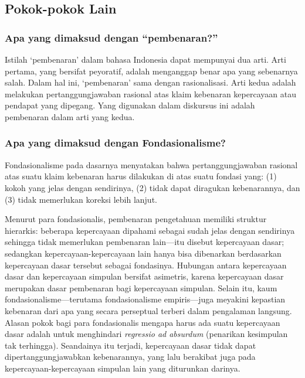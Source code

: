 \documentclass[11pt,twoside,a5paper,openany]{memoir}
\begin{document}
\hypertarget{pokok-pokok-lain-1}{%
\subsection{Pokok-pokok Lain}\label{pokok-pokok-lain-1}}

\hypertarget{apa-yang-dimaksud-dengan-pembenaran}{%
\subsubsection{Apa yang dimaksud dengan
``pembenaran?''}\label{apa-yang-dimaksud-dengan-pembenaran}}

Istilah `pembenaran' dalam bahasa Indonesia dapat mempunyai dua arti.
Arti pertama, yang bersifat peyoratif, adalah menganggap benar apa yang
sebenarnya salah. Dalam hal ini, `pembenaran' sama dengan rasionalisasi.
Arti kedua adalah melakukan pertanggungjawaban rasional atas klaim
kebenaran kepercayaan atau pendapat yang dipegang. Yang digunakan dalam
diskursus ini adalah pembenaran dalam arti yang kedua.

\hypertarget{apa-yang-dimaksud-dengan-fondasionalisme}{%
\subsubsection{Apa yang dimaksud dengan
Fondasionalisme?}\label{apa-yang-dimaksud-dengan-fondasionalisme}}

Fondasionalisme pada dasarnya menyatakan bahwa pertanggungjawaban
rasional atas suatu klaim kebenaran harus dilakukan di atas suatu
fondasi yang: (1) kokoh yang jelas dengan sendirinya, (2) tidak dapat
diragukan kebenarannya, dan (3) tidak memerlukan koreksi lebih lanjut.

Menurut para fondasionalis, pembenaran pengetahuan memiliki struktur
hierarkis: beberapa kepercayaan dipahami sebagai sudah jelas dengan
sendirinya sehingga tidak memerlukan pembenaran lain---itu disebut
kepercayaan dasar; sedangkan kepercayaan-kepercayaan lain hanya bisa
dibenarkan berdasarkan kepercayaan dasar tersebut sebagai fondasinya.
Hubungan antara kepercayaan dasar dan kepercayaan simpulan bersifat
asimetris, karena kepercayaan dasar merupakan dasar pembenaran bagi
kepercayaan simpulan. Selain itu, kaum fondasionalisme---terutama
fondasionalisme empiris---juga meyakini kepastian kebenaran dari apa
yang secara perseptual terberi dalam pengalaman langsung. Alasan pokok
bagi para fondasionalis mengapa harus ada suatu kepercayaan dasar adalah
untuk menghindari \emph{regressio ad absurdum} (penarikan kesimpulan tak
terhingga). Seandainya itu terjadi, kepercayaan dasar tidak dapat
dipertanggungjawabkan kebenarannya, yang lalu berakibat juga pada
kepercayaan-kepercayaan simpulan lain yang diturunkan darinya.
\end{document}
